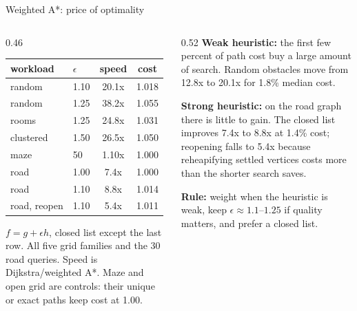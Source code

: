 \documentclass[aspectratio=169,10pt]{beamer}
\begin{document}
\begin{frame}{Weighted A*: price of optimality}
  \begin{columns}[T,onlytextwidth]
    \begin{column}{0.46\textwidth}
      \small
      \begin{tabular}{llcc}
        \toprule
        workload & $\epsilon$ & speed & cost\\
        \midrule
        random & 1.10 & 20.1x & 1.018\\
        random & 1.25 & 38.2x & 1.055\\
        rooms & 1.25 & 24.8x & 1.031\\
        clustered & 1.50 & 26.5x & 1.050\\
        maze & 50 & 1.10x & 1.000\\
        road & 1.00 & 7.4x & 1.000\\
        road & 1.10 & 8.8x & 1.014\\
        road, reopen & 1.10 & 5.4x & 1.011\\
        \bottomrule
      \end{tabular}

      \vspace{0.5em}
      \footnotesize $f=g+\epsilon h$, closed list except the last row.  All
      five grid families and the 30 road queries.  Speed is
      Dijkstra/weighted A*.  Maze and open grid are controls: their unique or
      exact paths keep cost at 1.00.
    \end{column}
    \begin{column}{0.52\textwidth}
      \small
      \textbf{Weak heuristic:} the first few percent of path cost buy a large
      amount of search.  Random obstacles move from 12.8x to 20.1x for 1.8\%
      median cost.

      \vspace{0.6em}
      \textbf{Strong heuristic:} on the road graph there is little to gain.
      The closed list improves 7.4x to 8.8x at 1.4\% cost; reopening falls to
      5.4x because reheapifying settled vertices costs more than the shorter
      search saves.

      \vspace{0.6em}
      \textbf{Rule:} weight when the heuristic is weak, keep
      $\epsilon\approx1.1$--$1.25$ if quality matters, and prefer a closed
      list.
    \end{column}
  \end{columns}
\end{frame}
\end{document}
